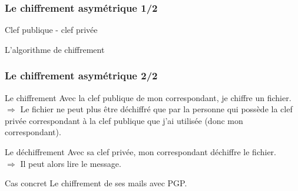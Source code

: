 \begin{frame}
\frametitle{Le chiffrement asymétrique 1/2}

\begin{block}{Clef publique - clef privée}
\end{block}

\begin{block}{L'algorithme de chiffrement}
\end{block}

\end{frame}

\begin{frame}
\frametitle{Le chiffrement asymétrique 2/2}

\begin{block}{Le chiffrement}
Avec la clef publique de mon correspondant, je chiffre  un fichier.
\\$\Rightarrow$ Le fichier ne peut plus être déchiffré que par la personne qui possède la clef privée correspondant à la clef publique que j'ai utilisée (donc mon correspondant).
\end{block}

\begin{block}{Le déchiffrement}
Avec sa clef privée,  mon correspondant déchiffre le fichier.
\\
$\Rightarrow$ Il peut alors lire le message.
\end{block}

\begin{block}{Cas concret}
Le chiffrement de ses mails avec PGP.
\end{block}
\end{frame}

